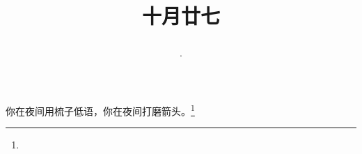 \title{\date[d=27,m=11,y=2024][year:cn-y,年,month:cn,day:cn,日,·,weekday]·十月廿七 }
你在夜间用梳子低语，你在夜间打磨箭头。\footnote{ }

